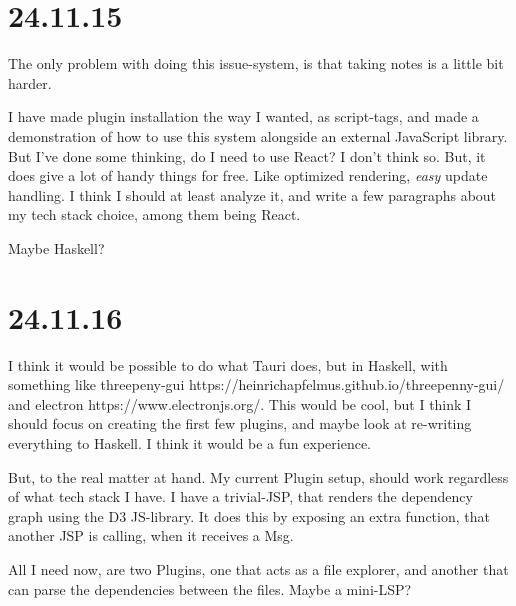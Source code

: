 \section{24.11.15}

The only problem with doing this issue-system, is that taking notes is a little
bit harder.

I have made plugin installation the way I wanted, as script-tags, and made a
demonstration of how to use this system alongside an external JavaScript
library. But I've done some thinking, do I need to use React? I don't think so.
But, it does give a lot of handy things for free. Like optimized rendering,
\textit{easy} update handling.
I think I should at least analyze it, and write a few paragraphs about my tech
stack choice, among them being React.

Maybe Haskell?


\section{24.11.16}

I think it would be possible to do what Tauri does, but in Haskell, with
something like threepeny-gui https://heinrichapfelmus.github.io/threepenny-gui/
and electron https://www.electronjs.org/. This would be cool, but I think I
should focus on creating the first few plugins, and maybe look at re-writing
everything to Haskell. I think it would be a fun experience.

But, to the real matter at hand. My current Plugin setup, should work
regardless of what tech stack I have. I have a trivial-JSP, that renders the
dependency graph using the D3 JS-library. It does this by exposing an extra
function, that another JSP is calling, when it receives a Msg.

All I need now, are two Plugins, one that acts as a file explorer, and another
that can parse the dependencies between the files. Maybe a mini-LSP?
